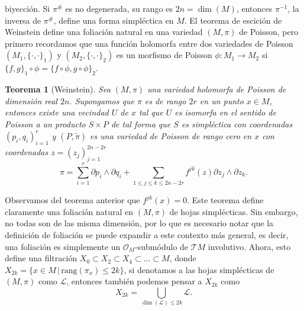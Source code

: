 \documentclass{article}
\newtheorem{teorema}{Teorema}[section]
\begin{document}
biyecci\'on. Si $\pi^{\#}$ es no degenerada, su rango es $2n=\dim(M)$, entonces $\pi^{-1}$, la inversa de $\pi^{\#}$, define una forma simpl\'ectica
en $M$. El teorema de escici\'on de Weinstein define una foliaci\'on natural en una variedad $(M,\pi)$ de Poisson, pero primero 
recordamos que una funci\'on holomorfa entre dos variedades de Poisson $(M_1,\{\cdot,\cdot\}_1)$ y $(M_2,\{\cdot,\cdot\}_2)$ es un morfismo de Poisson 
$\phi:M_1\rightarrow M_2$ si $\{f,g\}_1\circ\phi=\{f\circ\phi,g\circ\phi\}_2$.
\begin{teorema}[Weinstein]\label{weins}
        Sea $(M,\pi)$ una variedad holomorfa de Poisson de dimensi\'on real $2n$. Supongamos que $\pi$ es de rango $2r$ en un punto $x\in M$, 
        entonces existe una vecindad $U$ de $x$ tal que $U$ es isomorfa en el sentido de Poisson a un producto $S\times P$ de tal forma que $S$ es
        simpl\'ectica con coordenadas $(p_i,q_i)_{i=1}^r$ y $(P,\tilde{\pi})$ es una variedad de Poisson de rango cero en $x$
        con coordenadas $z=(z_j)_{j=1}^{2n-2r}$
        \[
                \pi=\sum_{i=1}^r \partial{p_i}\wedge\partial{q_i}+\sum_{1\leq j\leq k\leq 2n-2r} f^{jk}(z)\partial{z_j}\wedge\partial{z_k}.
        \]
\end{teorema} 
\noindent Observamos del teorema anterior que $f^{jk}(x)=0$. Este teorema define claramente una foliaci\'on natural en $(M,\pi)$ de hojas
simpl\'ecticas. Sin embargo, no todas son de las misma dimensi\'on, por lo que es necesario notar que la definici\'on de foliaci\'on
se puede expandir a este contexto m\'as general, es decir, una foliaci\'on es simplemente un $\mathcal{O}_M$-subm\'odulo de $\mathcal{T}M$ involutivo.
Ahora, esto define una filtraci\'on $X_0\subset X_2\subset X_4\subset\dots\subset M$, donde $X_{2k}=\{x\in M\,|\,\textrm{rang}(\pi_x)\leq 2k\}$,
si denotamos a las hojas simpl\'ecticas de $(M,\pi)$ como $\mathcal{L}$, entonces tambi\'en podemos pensar a $X_{2k}$ como 
$$
X_{2k}=\bigcup_{\dim(\mathcal{L})\leq 2k}\mathcal{L}.
$$
\end{document}
